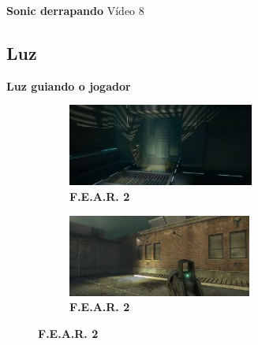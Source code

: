 \expandafter\documentclass\expandafter[table, usenames, svgnames, dvipsnames, \classopts]{beamer}
\begin{document}
\begin{frame}{\textbf{Sonic derrapando}}
	\centering
    Vídeo 8
\end{frame}

\subsection{Luz}
\begin{frame}{\textbf{Luz guiando o jogador}}
	\centering
	\begin{figure}
        \begin{subfigure}{\textwidth}
        	\centering
            \includegraphics[draft,height=2.7cm]{fear1}
            \caption{\scriptsize\textbf{F.E.A.R. 2}\footnotemark{}}
	    \end{subfigure}

        \begin{subfigure}{\textwidth}
	        \centering
            \includegraphics[draft,height=2.7cm]{fear2}
            \caption{\scriptsize\textbf{F.E.A.R. 2}\footnotemark{}}
	    \end{subfigure}
	\end{figure}

\end{frame}


\end{document}
